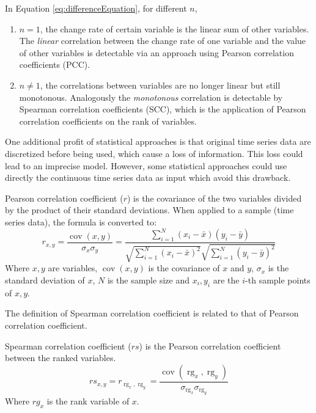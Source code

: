 In Equation \ref{eq:differenceEquation}, for different $n$,
\begin{enumerate}
    \item $n=1$, the change rate of certain variable is the linear sum of other variables.
    The \textit{linear} correlation between the change rate of one variable and the value of other variables is detectable via an approach using Pearson correlation coefficients (PCC).
    \item $n\neq 1$, the correlations between variables are no longer linear but still monotonous.
    Analogously the \textit{monotonous} correlation is detectable by Spearman correlation coefficients (SCC), which is the application of Pearson correlation coefficients on the rank of variables.
\end{enumerate}

One additional profit of statistical approaches is that original time series data are discretized before being used, which cause a loss of information.
This loss could lead to an imprecise model.
However, some statistical approaches could use directly the continuous time series data as input which avoid this drawback.

\begin{definition}
    Pearson correlation coefficient ($r$) is the covariance of the two variables divided by the product of their standard deviations.
    When applied to a sample (time series data), the formula is converted to:
    $${\displaystyle r_{x,y}={\frac {\operatorname {cov} (x,y)}{\sigma _{x}\sigma _{y}}}={\frac {\sum _{i=1}^{N}(x_{i}-{\bar {x}})(y_{i}-{\bar {y}})}{{\sqrt {\sum _{i=1}^{N}(x_{i}-{\bar {x}})^{2}}}{\sqrt {\sum _{i=1}^{N}(y_{i}-{\bar {y}})^{2}}}}}}$$
    Where $x,y$ are variables, $\operatorname {cov} (x,y)$ is the covariance of $x$ and $y$, $\sigma _{x}$ is the standard deviation of $x$, $N$ is the sample size and $x_i,y_i$ are the $i$-th sample points of $x,y$.
\end{definition}

The definition of Spearman correlation coefficient is related to that of Pearson correlation coefficient.

\begin{definition}
    Spearman correlation coefficient ($rs$) is the Pearson correlation coefficient between the ranked variables.
    $${\displaystyle rs_{x,y}=r_{\operatorname {rg} _{x},\operatorname {rg} _{y}}={\frac {\operatorname {cov} (\operatorname {rg} _{x},\operatorname {rg} _{y})}{\sigma _{\operatorname {rg} _{x}}\sigma _{\operatorname {rg} _{y}}}}}$$
    Where $rg_x$ is the rank variable of $x$.
\end{definition}

